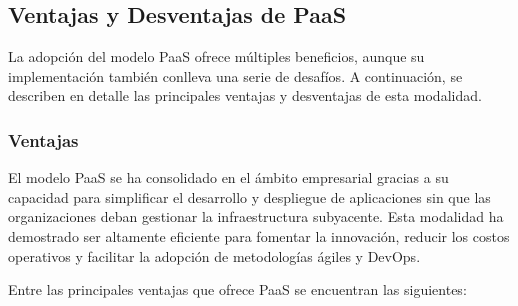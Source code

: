 {        \subsection{Ventajas y Desventajas de PaaS}
            La adopción del modelo PaaS ofrece múltiples beneficios, aunque su implementación también conlleva una serie de desafíos. A continuación, se describen en detalle las principales ventajas y desventajas de esta modalidad.
            
            \subsubsection{Ventajas}
                El modelo PaaS se ha consolidado en el ámbito empresarial gracias a su capacidad para simplificar el desarrollo y despliegue de aplicaciones sin que las organizaciones deban gestionar la infraestructura subyacente. Esta modalidad ha demostrado ser altamente eficiente para fomentar la innovación, reducir los costos operativos y facilitar la adopción de metodologías ágiles y DevOps.
                
                Entre las principales ventajas que ofrece PaaS se encuentran las siguientes:
                
}
